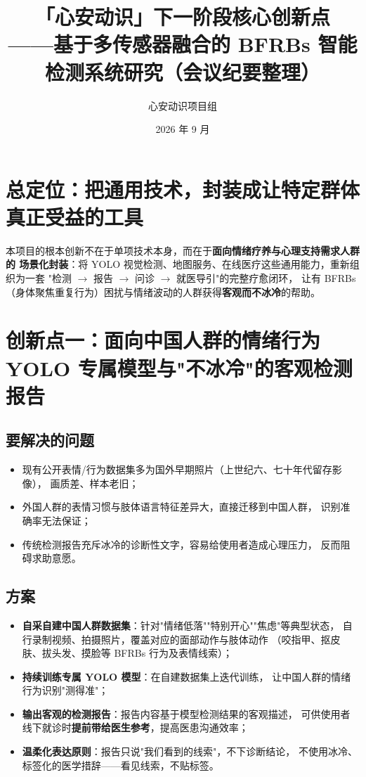 \documentclass[12pt, a4paper]{ctexart}
\title{\bfseries 「心安动识」下一阶段核心创新点\\ \large ——基于多传感器融合的 BFRBs 智能检测系统研究（会议纪要整理）}
\author{心安动识项目组}
\date{2026 年 9 月}
\begin{document}
\maketitle
\thispagestyle{empty}

\section*{总定位：把通用技术，封装成让特定群体真正受益的工具}

本项目的根本创新不在于单项技术本身，而在于\textbf{面向情绪疗养与心理支持需求人群的
场景化封装}：将 YOLO 视觉检测、地图服务、在线医疗这些通用能力，重新组织为一套
"检测 $\rightarrow$ 报告 $\rightarrow$ 问诊 $\rightarrow$ 就医导引"的完整疗愈闭环，
让有 BFRBs（身体聚焦重复行为）困扰与情绪波动的人群获得\textbf{客观而不冰冷}的帮助。

\section{创新点一：面向中国人群的情绪行为 YOLO 专属模型与"不冰冷"的客观检测报告}

\subsection{要解决的问题}
\begin{itemize}
  \item 现有公开表情/行为数据集多为国外早期照片（上世纪六、七十年代留存影像），
        画质差、样本老旧；
  \item 外国人群的表情习惯与肢体语言特征差异大，直接迁移到中国人群，
        识别准确率无法保证；
  \item 传统检测报告充斥冰冷的诊断性文字，容易给使用者造成心理压力，
        反而阻碍求助意愿。
\end{itemize}

\subsection{方案}
\begin{itemize}
  \item \textbf{自采自建中国人群数据集}：针对"情绪低落""特别开心""焦虑"等典型状态，
        自行录制视频、拍摄照片，覆盖对应的面部动作与肢体动作
        （咬指甲、抠皮肤、拔头发、摸脸等 BFRBs 行为及表情线索）；
  \item \textbf{持续训练专属 YOLO 模型}：在自建数据集上迭代训练，
        让中国人群的情绪行为识别"测得准"；
  \item \textbf{输出客观的检测报告}：报告内容基于模型检测结果的客观描述，
        可供使用者线下就诊时\textbf{提前带给医生参考}，提高医患沟通效率；
  \item \textbf{温柔化表达原则}：报告只说"我们看到的线索"，不下诊断结论，
        不使用冰冷、标签化的医学措辞——看见线索，不贴标签。
\end{itemize}
\end{document}

